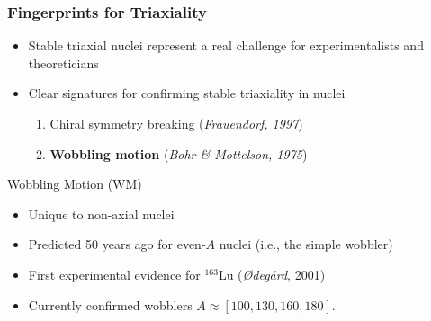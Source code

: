 \documentclass{beamer}
\begin{document}
\begin{frame}
  \frametitle{Fingerprints for Triaxiality}
  \begin{itemize}
    \item Stable triaxial nuclei represent a real challenge for experimentalists and theoreticians
    \item Clear signatures for confirming stable triaxiality in nuclei
    \begin{enumerate}
      \item Chiral symmetry breaking (\textit{Frauendorf, 1997})
      \item \textbf{Wobbling motion} (\textit{Bohr \& Mottelson, 1975})
    \end{enumerate}
  \end{itemize}
  \begin{block}{Wobbling Motion (WM)}
    \begin{itemize}
      \item Unique to non-axial nuclei
      \item Predicted 50 years ago for even-$A$ nuclei (i.e., the simple wobbler)
      \item First experimental evidence for $^{163}$Lu (\textit{Ødegård}, 2001)
      \item Currently confirmed wobblers $A\approx[100,130,160,180]$.
    \end{itemize}
  \end{block}
\end{frame}
\end{document}
